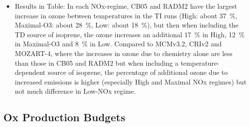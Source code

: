 \documentclass[11pt,a4paper]{article}
\begin{document}
\begin{itemize}
    \item Results in Table: In each NOx-regime, CB05 and RADM2 have the largest increase in ozone between temperatures in the TI runs (High: about 37~\%, Maximal-O3: about 28~\%, Low: about 18~\%), but then when including the TD source of isoprene, the ozone increases an additional 17~\% in High, 12~\% in Maximal-O3 and 8~\% in Low. Compared to MCMv3.2, CRIv2 and MOZART-4, where the increases in ozone due to chemistry alone are less than those in CB05 and RADM2 but when including a temperature-dependent source of isoprene, the percentage of additional ozone due to increased emissions is higher (especially High and Maximal NOx regimes) but not much difference in Low-NOx regime.
\end{itemize}

\subsection{Ox Production Budgets}
\end{document}
